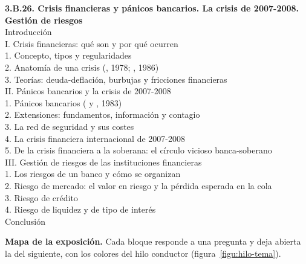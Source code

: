 \documentclass[11pt]{article}
\begin{document}
\begin{esquema}[unbreakable]
\textbf{3.B.26. Crisis financieras y pánicos bancarios. La crisis de 2007-2008. Gestión de riesgos}\\[2pt]
Introducción\\
I. Crisis financieras: qué son y por qué ocurren\\
\hspace*{1.5em}1. Concepto, tipos y regularidades\\
\hspace*{1.5em}2. Anatomía de una crisis (, 1978; , 1986)\\
\hspace*{1.5em}3. Teorías: deuda-deflación, burbujas y fricciones financieras\\
II. Pánicos bancarios y la crisis de 2007-2008\\
\hspace*{1.5em}1. Pánicos bancarios ( y , 1983)\\
\hspace*{1.5em}2. Extensiones: fundamentos, información y contagio\\
\hspace*{1.5em}3. La red de seguridad y sus costes\\
\hspace*{1.5em}4. La crisis financiera internacional de 2007-2008\\
\hspace*{1.5em}5. De la crisis financiera a la soberana: el círculo vicioso banca-soberano\\
III. Gestión de riesgos de las instituciones financieras\\
\hspace*{1.5em}1. Los riesgos de un banco y cómo se organizan\\
\hspace*{1.5em}2. Riesgo de mercado: el valor en riesgo y la pérdida esperada en la cola\\
\hspace*{1.5em}3. Riesgo de crédito\\
\hspace*{1.5em}4. Riesgo de liquidez y de tipo de interés\\
Conclusión
\end{esquema}

\begin{anotaciones}
\textbf{Mapa de la exposición.} Cada bloque responde a una pregunta y deja abierta la del siguiente, con los colores del hilo conductor (figura~\ref{figu:hilo-tema}).
\begin{infografiacaja}
\caption{Mapa del tema: la pregunta de cada bloque y el hilo que los une}\label{figu:mapa-tema}
\end{infografiacaja}
\end{anotaciones}
\end{document}
